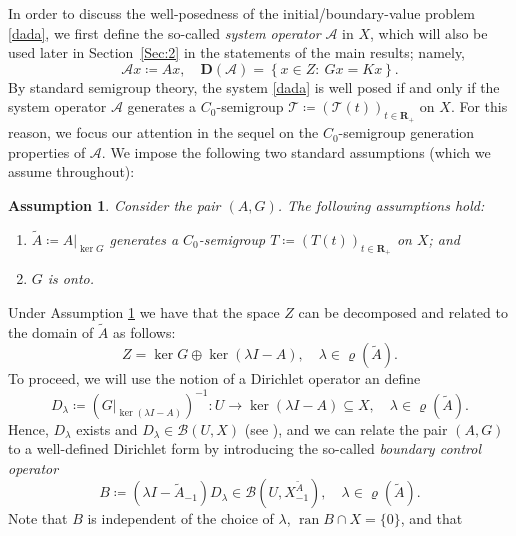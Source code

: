\documentclass[a4paper,11pt,reqno]{amsart}
\def\la{\lambda}
\def\calB{{\calB}}
\def\calB{{\mathcal{B}}}
\def\calA{{\mathcal{A}}}
\def\R{\mathbf{R}}
\theoremstyle{plain}
\numberwithin{equation}{section}
\newtheorem{mainassumptions}{Assumption}[section]
\begin{document}
In order to discuss the well-posedness of the initial/boundary-value problem \eqref{dada}, we first define the so-called \textit{system operator} $\mathcal{A}$ in $X$, which will also be used later in Section~\ref{Sec:2} in the statements of the main results; namely,
\begin{equation}\label{Big-A}
\calA x\coloneqq {A}x,\quad \bm{D}(\calA)= \left\{x\in {Z}:\: Gx =Kx\right\}.
\end{equation}
By standard semigroup theory, the system \eqref{dada} is well posed if and only if the system operator $\mathcal{A}$ generates a $C_0$-semigroup $\mathcal{T} \coloneqq (\mathcal{T}(t))_{t\in\R_+}$ on $X$. For this reason, we focus our attention in the sequel on the $C_0$-semigroup generation properties of $\mathcal{A}$. We impose the following two standard assumptions (which we assume throughout):
\begin{mainassumptions}\label{Assp11}
Consider the pair $({{A}},{G})$. The following assumptions hold:
\begin{enumerate}[label=\normalfont(\roman*)]
\item $\tilde{{{A}}}\coloneqq {{A}}\vert_{\ker {G}}$ generates a $C_0$-semigroup ${{T}}\coloneqq ({T}(t))_{t\in\R_+}$ on ${X}$; and
\item ${G}$ is onto.
\end{enumerate}
\end{mainassumptions}
Under Assumption \ref{Assp11} we have that the space ${Z}$ can be decomposed and related to the domain of $\tilde{{A}}$ as follows:
\begin{equation*}
{Z}=\ker {G} \oplus \ker ( \la I- {A} ),\quad \la\in \varrho(\tilde{{A}}).
\end{equation*}
To proceed, we will use the notion of a Dirichlet operator an define
\begin{equation*}\label{Dirichlet}
{D}_\la\coloneqq ({G}|_{\ker(\la I-{A})})^{-1}: {U}\to \ker(\la I-{A})\subseteq {X},\quad \la\in\varrho(\tilde{{A}}).
\end{equation*}
Hence, ${D}_\la$ exists and ${D}_\la\in\calB(U,X)$ (see \cite[Lemmas 1.2 and 1.3]{MR904952}), and we can relate the pair $(A,G)$ to a well-defined Dirichlet form by introducing the so-called \textit{boundary control operator}
\begin{equation*}\label{boundary-control}
{B}\coloneqq (\la I-\tilde{{A}}_{-1}){D}_\la\in\calB({U},{X}_{-1}^{\tilde{{A}}}),\quad \la\in \varrho(\tilde{{A}}).
\end{equation*}
Note that ${B}$ is independent of the choice of $\la$, $\operatorname{ran}{B}\cap {X}=\{0\}$, and that 
\end{document}
